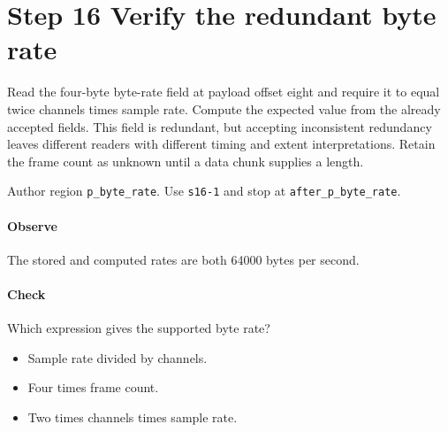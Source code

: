 \section{Step 16 Verify the redundant byte rate}\label{pcm-wav-s16}
Read the four-byte byte-rate field at payload offset eight and require it to equal twice channels times sample rate. Compute the expected value from the already accepted fields. This field is redundant, but accepting inconsistent redundancy leaves different readers with different timing and extent interpretations. Retain the frame count as unknown until a data chunk supplies a length.

Author region \texttt{p\_byte\_rate}. Use \texttt{s16-1} and stop at \texttt{after\_p\_byte\_rate}.

\paragraph{Observe} The stored and computed rates are both 64000 bytes per second.

\paragraph{Check} Which expression gives the supported byte rate?
\begin{itemize}
\item[A.] Sample rate divided by channels.
\item[B.] Four times frame count.
\item[C.] Two times channels times sample rate.
\end{itemize}

